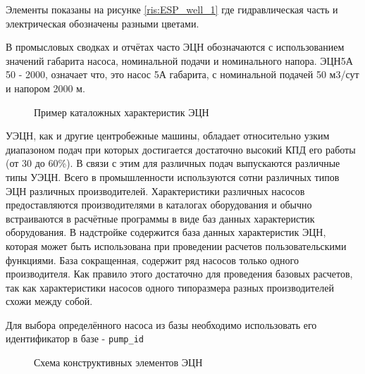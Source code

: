Элементы показаны на рисунке \ref{ris:ESP_well_1} где гидравлическая часть и электрическая обозначены разными цветами.

В промысловых сводках и отчётах часто ЭЦН обозначаются с использованием значений габарита насоса, номинальной подачи и номинального напора. ЭЦН5А 50 - 2000, означает что, это насос 5А габарита, с номинальной подачей 50 м3/сут и напором 2000 м. 

\begin{figure}[H]
	\caption{Пример каталожных характеристик ЭЦН}
	\label{ris:novomet_ESP_80}
\end{figure}

УЭЦН, как и другие центробежные машины, обладает относительно узким диапазоном подач при которых достигается достаточно высокий КПД его работы (от 30 до 60\%). В связи с этим для различных подач выпускаются различные типы УЭЦН. Всего в промышленности используются сотни различных типов ЭЦН различных производителей. Характеристики различных насосов предоставляются производителями в каталогах оборудования и обычно встраиваются в расчётные программы в виде баз данных характеристик оборудования. В надстройке \unf{} содержится база данных характеристик ЭЦН, которая может быть использована при проведении расчетов пользовательскими функциями. База сокращенная, содержит ряд насосов только одного производителя. Как правило этого достаточно для проведения базовых расчетов, так как характеристики насосов одного типоразмера разных производителей схожи между собой. 

Для выбора определённого насоса из базы необходимо использовать его идентификатор в базе - \texttt{pump_id}

\begin{figure}[H]
	\begin{center}
		
		\caption{Схема конструктивных элементов ЭЦН}
		\label{ris:ESP_well_2}
	\end{center}
\end{figure}


